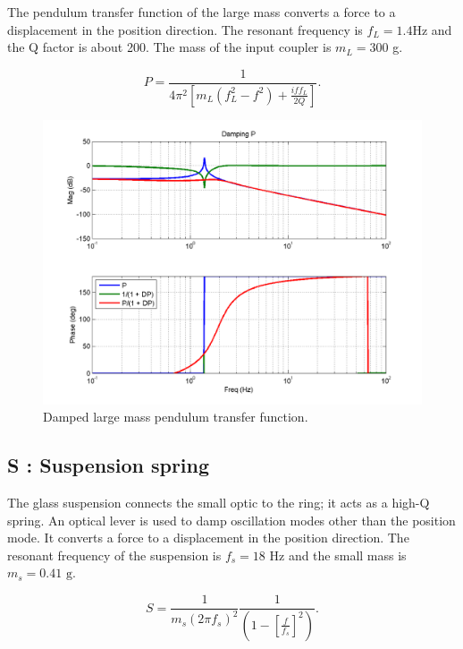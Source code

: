 The pendulum transfer function of the large mass converts a force to a displacement in the position direction.  The resonant frequency is $f_L = 1.4 \mbox{Hz}$ and the Q factor is about 200. The mass of the input coupler is $m_L = 300$ g.

\begin{equation}
P = \frac{1}{4 \pi^2\left[m_L (f_L^2-f^2)+\frac{iff_L}{2Q}\right]}.
\label{eq:P}
\end{equation}

\begin{figure}[htb]
\includegraphics[width=\columnwidth]{figures/controls/P.png}%
\caption{Damped large mass pendulum transfer function.}%
\label{fig:DPloop}%
\end{figure}

\subsection{S : Suspension spring}

The glass suspension connects the small optic to the ring; it acts as a high-Q spring. An optical lever is used to damp oscillation modes other than the position mode. It converts a force to a displacement in the position direction.  The resonant frequency of the suspension is $f_s = 18 \mbox{ Hz}$ and the small mass is $m_s = 0.41 \mbox{ g}$.

\begin{equation}
S = \frac{1}{m_s (2 \pi f_s)^2}\frac{1}{\left(1 - \left[\frac{f}{f_s}\right]^2\right)}.
\label{eq:S}
\end{equation}

